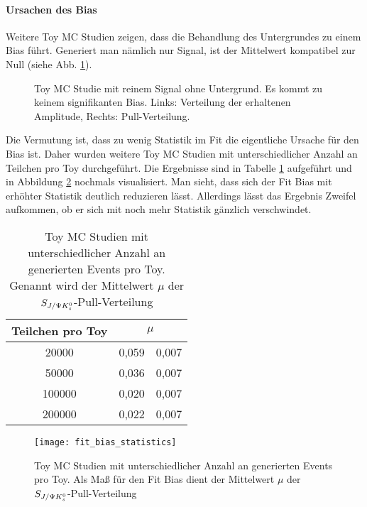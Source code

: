 \paragraph{Ursachen des Bias}
Weitere Toy MC Studien zeigen, dass die Behandlung des Untergrundes zu einem Bias führt. Generiert man nämlich nur Signal, ist der Mittelwert kompatibel zur Null (siehe Abb. \ref{fig:toys_no_bkg}).

\begin{figure}[hptb]
\centering
\caption{Toy MC Studie mit reinem Signal ohne Untergrund. Es kommt zu keinem signifikanten Bias. Links: Verteilung der erhaltenen Amplitude, Rechts: Pull-Verteilung.}
\label{fig:toys_no_bkg}
\end{figure}

Die Vermutung ist, dass zu wenig Statistik im Fit die eigentliche Ursache für den Bias ist. Daher wurden weitere Toy MC Studien mit unterschiedlicher Anzahl an Teilchen pro Toy durchgeführt. Die Ergebnisse sind in Tabelle \ref{tab:fit_bias_events} aufgeführt und in Abbildung \ref{fig:fit_bias_events} nochmals visualisiert. Man sieht, dass sich der Fit Bias mit erhöhter Statistik deutlich reduzieren lässt. Allerdings lässt das Ergebnis Zweifel aufkommen, ob er sich mit noch mehr Statistik gänzlich verschwindet.

\begin{table}[hptb]
\centering
\caption{Toy MC Studien mit unterschiedlicher Anzahl an generierten Events pro Toy. Genannt wird der Mittelwert $\mu$ der $S_{J/\Psi K_s^0}$-Pull-Verteilung}
\label{tab:fit_bias_events}
\begin{tabular}{cr@{$\pm$}l}
\hline \hline 
Teilchen pro Toy & \multicolumn{2}{c}{$\mu$}  \\ \hline
20000            &  0,059 & 0,007 \\
50000            &  0,036 & 0,007 \\
100000           &  0,020 & 0,007 \\
200000           &  0,022 & 0,007 \\ 
\hline \hline
\end{tabular}
\end{table}

\begin{figure}[hptb]
\centering
\texttt{[image: fit\_bias\_statistics]}
\caption{Toy MC Studien mit unterschiedlicher Anzahl an generierten Events pro Toy. Als Maß für den Fit Bias dient der Mittelwert $\mu$ der $S_{J/\Psi K_s^0}$-Pull-Verteilung}
\label{fig:fit_bias_events}
\end{figure}

